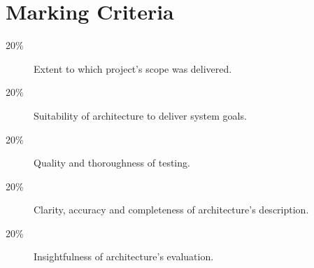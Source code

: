 \documentclass{csse4400}
\begin{document}
\section{Marking Criteria}

\begin{description}
    \item[20\%] Extent to which project's scope was delivered.
    \item[20\%] Suitability of architecture to deliver system goals.
    \item[20\%] Quality and thoroughness of testing.
    \item[20\%] Clarity, accuracy and completeness of architecture's description.
    \item[20\%] Insightfulness of architecture's evaluation.
\end{description}


%




\end{document}
